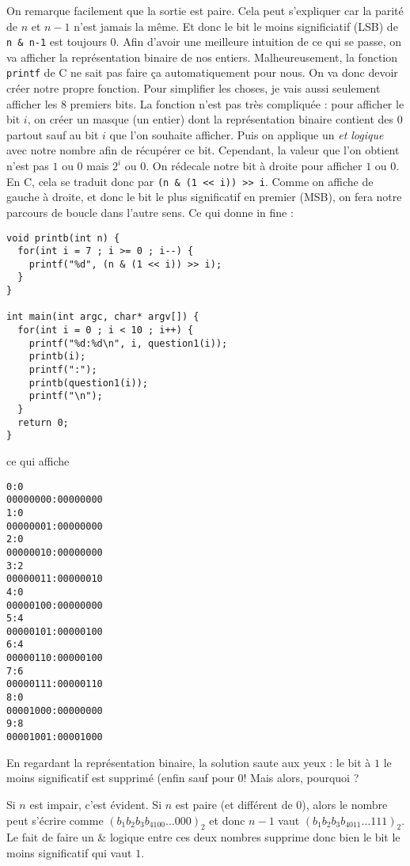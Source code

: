 \documentclass{article}
\begin{document}
On remarque facilement que la sortie est paire. Cela peut s'expliquer car la parité de \(n\) et \(n-1\) n'est jamais la même. Et donc le bit le moins significiatif (LSB) de \texttt{n & n-1} est toujours \(0\). Afin d'avoir une meilleure intuition de ce qui se passe, on va afficher la représentation binaire de nos entiers. Malheureusement, la fonction \texttt{printf} de C ne sait pas faire ça automatiquement pour nous. On va donc devoir créer notre propre fonction. Pour simplifier les choses, je vais aussi seulement afficher les \(8\) premiers bits. La fonction n'est pas très compliquée : pour afficher le bit \(i\), on créer un masque (un entier) dont la représentation binaire contient des \(0\) partout sauf au bit \(i\) que l'on souhaite afficher. Puis on applique un \textit{et logique} avec notre nombre afin de récupérer ce bit. Cependant, la valeur que l'on obtient n'est pas \(1\) ou \(0\) mais \(2^i\) ou \(0\). On rédecale notre bit à droite pour afficher \(1\) ou \(0\). En C, cela se traduit donc par \texttt{(n & (1 << i)) >> i}. Comme on affiche de gauche à droite, et donc le bit le plus significatif en premier (MSB), on fera notre parcours de boucle dans l'autre sens. Ce qui donne in fine :
\begin{verbatim}
void printb(int n) {
  for(int i = 7 ; i >= 0 ; i--) {
    printf("%d", (n & (1 << i)) >> i);
  }
}

int main(int argc, char* argv[]) {
  for(int i = 0 ; i < 10 ; i++) {
    printf("%d:%d\n", i, question1(i));
    printb(i);
    printf(":");
    printb(question1(i));
    printf("\n");
  }
  return 0;
}
\end{verbatim}

ce qui affiche

\begin{verbatim}
0:0
00000000:00000000
1:0
00000001:00000000
2:0
00000010:00000000
3:2
00000011:00000010
4:0
00000100:00000000
5:4
00000101:00000100
6:4
00000110:00000100
7:6
00000111:00000110
8:0
00001000:00000000
9:8
00001001:00001000
\end{verbatim}

En regardant la représentation binaire, la solution saute aux yeux : le bit à \(1\) le moins significatif est supprimé (enfin sauf pour \(0\)! Mais alors, pourquoi ?

Si \(n\) est impair, c'est évident. Si \(n\) est paire (et différent de \(0\)), alors le nombre peut s'écrire comme \((b_1b_2b_3b_4100\dots 000)_2\) et donc \(n-1\) vaut \((b_1b_2b_3b_4011\dots 111)_2\). Le fait de faire un \(\&\) logique entre ces deux nombres supprime donc bien le bit le moins significatif qui vaut \(1\).
\end{document}
